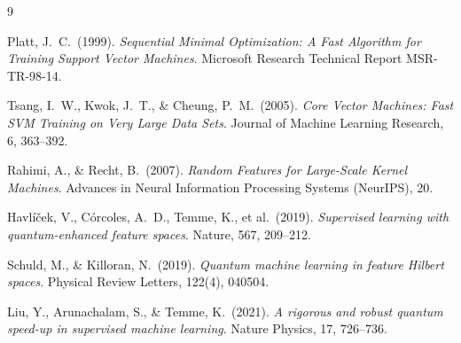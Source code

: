 \documentclass[12pt,a4paper]{article}
\begin{document}
\newpage
    \begin{thebibliography}{9}
    
    Platt, J.\ C.\ (1999).
    \textit{Sequential Minimal Optimization: A Fast Algorithm for Training
    Support Vector Machines}.
    Microsoft Research Technical Report MSR-TR-98-14.
    
    Tsang, I.\ W., Kwok, J.\ T., \& Cheung, P.\ M.\ (2005).
    \textit{Core Vector Machines: Fast SVM Training on Very Large Data Sets}.
    Journal of Machine Learning Research, 6, 363--392.
    
    Rahimi, A., \& Recht, B.\ (2007).
    \textit{Random Features for Large-Scale Kernel Machines}.
    Advances in Neural Information Processing Systems (NeurIPS), 20.
    
    Havlíček, V., Córcoles, A.\ D., Temme, K., et al.\ (2019).
    \textit{Supervised learning with quantum-enhanced feature spaces}.
    Nature, 567, 209--212.
    
    Schuld, M., \& Killoran, N.\ (2019).
    \textit{Quantum machine learning in feature Hilbert spaces}.
    Physical Review Letters, 122(4), 040504.
    
    Liu, Y., Arunachalam, S., \& Temme, K.\ (2021).
    \textit{A rigorous and robust quantum speed-up in supervised machine
    learning}.
    Nature Physics, 17, 726--736.
    
    \end{thebibliography}
\end{document}
